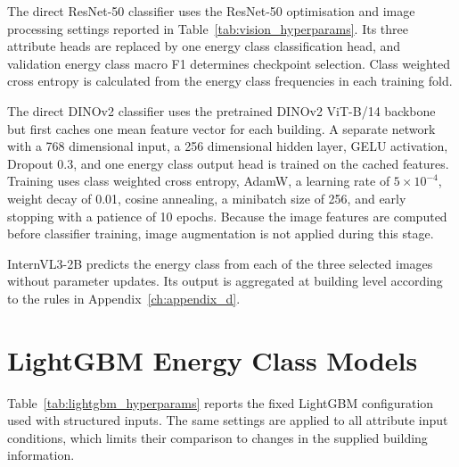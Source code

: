 The direct ResNet-50 classifier uses the ResNet-50 optimisation and image processing settings reported in Table~\ref{tab:vision_hyperparams}.
Its three attribute heads are replaced by one energy class classification head, and validation energy class macro F1 determines checkpoint selection.
Class weighted cross entropy is calculated from the energy class frequencies in each training fold.

The direct DINOv2 classifier uses the pretrained DINOv2 ViT-B/14 backbone but first caches one mean feature vector for each building.
A separate network with a 768 dimensional input, a 256 dimensional hidden layer, GELU activation, Dropout 0.3, and one energy class output head is trained on the cached features.
Training uses class weighted cross entropy, AdamW, a learning rate of \(5\times10^{-4}\), weight decay of 0.01, cosine annealing, a minibatch size of 256, and early stopping with a patience of 10 epochs.
Because the image features are computed before classifier training, image augmentation is not applied during this stage.

InternVL3-2B predicts the energy class from each of the three selected images without parameter updates.
Its output is aggregated at building level according to the rules in Appendix~\ref{ch:appendix_d}.

\section{LightGBM Energy Class Models}
\label{sec:appendix_b_lightgbm}

Table~\ref{tab:lightgbm_hyperparams} reports the fixed \acs{LightGBM} configuration used with structured inputs.
The same settings are applied to all attribute input conditions, which limits their comparison to changes in the supplied building information.

